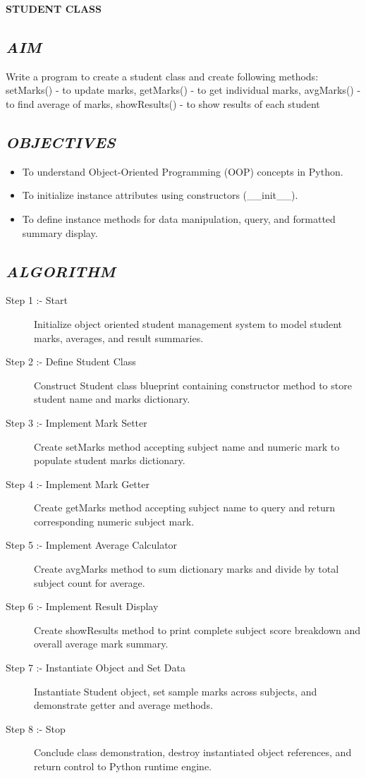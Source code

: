 \documentclass[11pt,a4paper]{article}
\begin{document}
\vspace{0.2cm}
\begin{center}
{\Huge \textbf{\textcolor{navyblue}{STUDENT CLASS}}}
\end{center}
\vspace{0.3cm}

\subsection*{\textit{AIM}}
Write a program to create a student class and create following methods: setMarks() - to update marks, getMarks() - to get individual marks, avgMarks() - to find average of marks, showResults() - to show results of each student

\subsection*{\textit{OBJECTIVES}}
\begin{itemize}
  \item To understand Object-Oriented Programming (OOP) concepts in Python.
  \item To initialize instance attributes using constructors (__init__).
  \item To define instance methods for data manipulation, query, and formatted summary display.
\end{itemize}

\subsection*{\textit{ALGORITHM}}
\begin{description}
  \item[Step 1 :- Start] Initialize object oriented student management system to model student marks, averages, and result summaries.
  \item[Step 2 :- Define Student Class] Construct Student class blueprint containing constructor method to store student name and marks dictionary.
  \item[Step 3 :- Implement Mark Setter] Create setMarks method accepting subject name and numeric mark to populate student marks dictionary.
  \item[Step 4 :- Implement Mark Getter] Create getMarks method accepting subject name to query and return corresponding numeric subject mark.
  \item[Step 5 :- Implement Average Calculator] Create avgMarks method to sum dictionary marks and divide by total subject count for average.
  \item[Step 6 :- Implement Result Display] Create showResults method to print complete subject score breakdown and overall average mark summary.
  \item[Step 7 :- Instantiate Object and Set Data] Instantiate Student object, set sample marks across subjects, and demonstrate getter and average methods.
  \item[Step 8 :- Stop] Conclude class demonstration, destroy instantiated object references, and return control to Python runtime engine.
\end{description}
\end{document}
